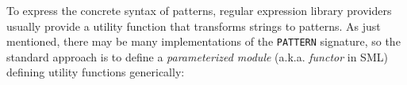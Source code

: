 

To express the concrete syntax of patterns, regular expression library providers usually provide a utility function that transforms strings to patterns. As just mentioned, there  may be many implementations of the \lstinline{PATTERN} signature, so the standard approach is to define a \emph{parameterized module} (a.k.a. \emph{functor} in SML) defining utility functions generically:

